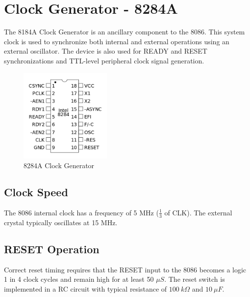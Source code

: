 \section{Clock Generator - 8284A}
The 8184A Clock Generator is an ancillary component to the 8086. This system clock is used to synchronize both internal and external operations using an external oscillator. The device is also used for READY and RESET synchronizations and TTL-level peripheral clock signal generation.

        \begin{figure}[h]
            \begin{center}
                \includegraphics[width=0.4\textwidth]{figures/8284a.png}
                \caption{8284A Clock Generator} \label{fig:8284a}
            \end{center}
        \end{figure}

    \subsection{Clock Speed}
    The 8086 internal clock has a frequency of 5 MHz ($\frac{1}{3}$ of CLK). The external crystal typically oscillates at 15 MHz.

    \subsection{RESET Operation}
    Correct reset timing requires that the RESET input to the 8086 becomes a logic 1 in 4 clock cycles and remain high for at least 50 $\mu S$. The reset switch is implemented in a RC circuit with typical resistance of $100 \ k\Omega$ and $10 \ \mu F$.
